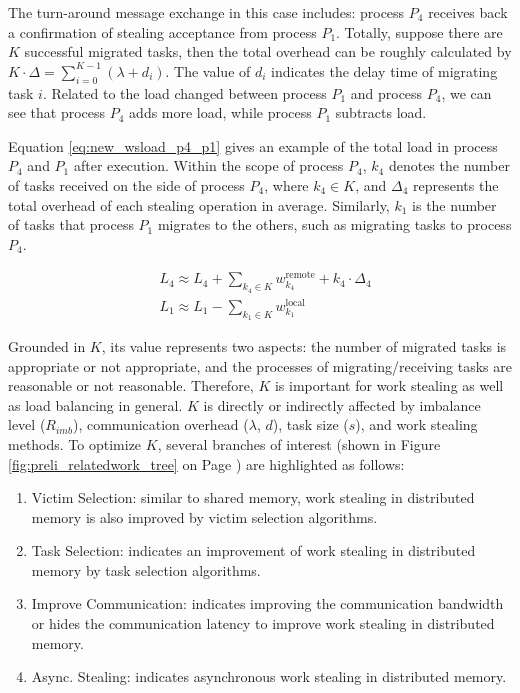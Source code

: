 The turn-around message exchange in this case includes: process $P_{4}$ receives back a confirmation of stealing acceptance from process $P_{1}$. Totally, suppose there are $K$ successful migrated tasks, then the total overhead can be roughly calculated by $K \cdot \Delta = \sum_{i=0}^{K-1}(\lambda + d_{i})$. The value of $d_{i}$ indicates the delay time of migrating task $i$. Related to the load changed between process $P_{1}$ and process $P_{4}$, we can see that process $P_{4}$ adds more load, while process $P_{1}$ subtracts load.\\

\clearpage

Equation \ref{eq:new_wsload_p4_p1} gives an example of the total load in process $P_{4}$ and $P_{1}$ after execution. Within the scope of process $P_{4}$, $k_{4}$ denotes the number of tasks received on the side of process $P_{4}$, where $k_{4} \in K$, and $\Delta_{4}$ represents the total overhead of each stealing operation in average. Similarly, $k_{1}$ is the number of tasks that process $P_{1}$ migrates to the others, such as migrating tasks to process $P_{4}$.

\begin{equation} \label{eq:new_wsload_p4_p1}
\begin{split}
	&L_{4} \approx  L_{4} + \sum_{k_{4} \in K} w^{\text{remote}}_{k_{4}} + k_{4} \cdot \Delta_{4} \\
	&L_{1} \approx  L_{1} - \sum_{k_{1} \in K} w^{\text{local}}_{k_{1}}
\end{split}
\end{equation}

Grounded in $K$, its value represents two aspects: the number of migrated tasks is appropriate or not appropriate, and the processes of migrating/receiving tasks are reasonable or not reasonable. Therefore, $K$ is important for work stealing as well as load balancing in general. $K$ is directly or indirectly affected by imbalance level ($R_{imb}$), communication overhead ($\lambda$, $d$), task size ($s$), and work stealing methods. To optimize $K$, several branches of interest (shown in Figure \ref{fig:preli_relatedwork_tree} on Page \pageref{fig:preli_relatedwork_tree}) are highlighted as follows:

\begin{enumerate}[label=(\arabic*)] \label{exp:branch_1_2_3_4}
    \item Victim Selection: similar to shared memory, work stealing in distributed memory is also improved by victim selection algorithms.
    \item Task Selection: indicates an improvement of work stealing in distributed memory by task selection algorithms.
    \item Improve Communication: indicates improving the communication bandwidth or hides the communication latency to improve work stealing in distributed memory.
    \item Async. Stealing: indicates asynchronous work stealing in distributed memory.
\end{enumerate}

